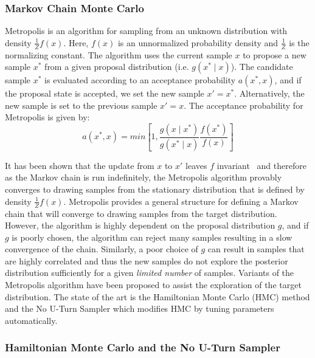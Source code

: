 \subsubsection{Markov Chain Monte Carlo}\label{sec:mcmc}

Metropolis is an algorithm for sampling from an unknown distribution with density $\frac{1}{Z} f(x)$. Here, $f(x)$ is an unnormalized probability density and $\frac{1}{Z}$ is the normalizing constant. The algorithm uses the current sample $x$ to propose a new sample $x^*$ from a given proposal distribution (i.e. $g(x^* \mid x)$). The candidate sample $x^*$ is evaluated according to an acceptance probability $a(x^*, x)$, and if the proposal state is accepted, we set the new sample $x' = x^*$. Alternatively, the new sample is set to the previous sample $x' = x$. The acceptance probability for Metropolis is given by:
\begin{equation}
	a(x^*, x) = min \left[ 1, \frac{g(x \mid x^*)}{g(x^* \mid x)} \frac{f(x^*)}{f(x)} \right]
\end{equation}

It has been shown that the update from $x$ to $x'$ leaves $f$ invariant~\citep{mackay1998introduction, gelman2014bayesian} and therefore as the Markov chain is run indefinitely, the Metropolis algorithm provably converges to drawing samples from the stationary distribution that is defined by density $\frac{1}{Z}f(x)$. Metropolis provides a general structure for defining a Markov chain that will converge to drawing samples from the target distribution. However, the algorithm is highly dependent on the proposal distribution $g$, and if $g$ is poorly chosen, the algorithm can reject many samples resulting in a slow convergence of the chain. Similarly, a poor choice of $g$ can result in samples that are highly correlated and thus the new samples do not explore the posterior distribution sufficiently for a given \textit{limited number} of samples. Variants of the Metropolis algorithm have been proposed to assist the exploration of the target distribution. The state of the art is the Hamiltonian Monte Carlo (HMC) method and the No U-Turn Sampler which modifies HMC by tuning parameters automatically.

\subsubsection{Hamiltonian Monte Carlo and the No U-Turn Sampler}\label{sec:hmc_nuts}

